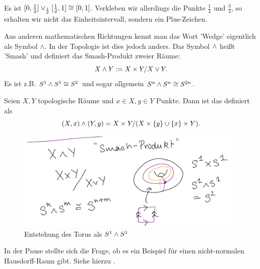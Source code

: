 \begin{example}
    Es ist $[0,\frac{1}{2}] \vee_{\frac{1}{2}} [\frac{1}{2},1] \cong [0,1]$. Verkleben wir allerdings die Punkte $\frac{1}{4}$ und $\frac{3}{4}$, so erhalten wir nicht das Einheitsintervall, sondern ein Plus-Zeichen.
\end{example}

\begin{remark*}
    Aus anderen mathematischen Richtungen kennt man das Wort 'Wedge' eigentlich als Symbol $\wedge$. In der Topologie ist dies jedoch anders. Das Symbol $\wedge$ heißt 'Smash' und definiert das Smash-Produkt zweier Räume:
     \[
    X \land Y := X \times  Y / X \vee Y
    .\]  
Es ist z.B. $S^1\wedge S^1 \cong S^2$ und sogar allgemein $S^n \wedge S^n \cong S^{2n}$.
\end{remark*}

\begin{definition}\label{def:smash-produkt}
    Seien $X,Y$ topologische Räume und  $x\in X, y\in Y$ Punkte. Dann ist das  definiert als
    \[
        (X,x) \wedge (Y,y) = X\times Y / (X\times \left \{y\right\} \cup \left \{x\right\} \times Y)
    .\] 
\end{definition}

\begin{figure}[h]
    \centering
    \includegraphics[scale=0.23]{figures/handdrawn/smash-produkt.png}
    \caption{Entstehung des Torus als $S^1 \wedge S^1$}
\end{figure}
\begin{remark*}
    In der Pause stellte sich die Frage, ob es ein Beispiel für einen nicht-normalen Hausdorff-Raum gibt. Siehe hierzu \cite[][Gegenbeispiel 86]{counterexamples}.
\end{remark*}

